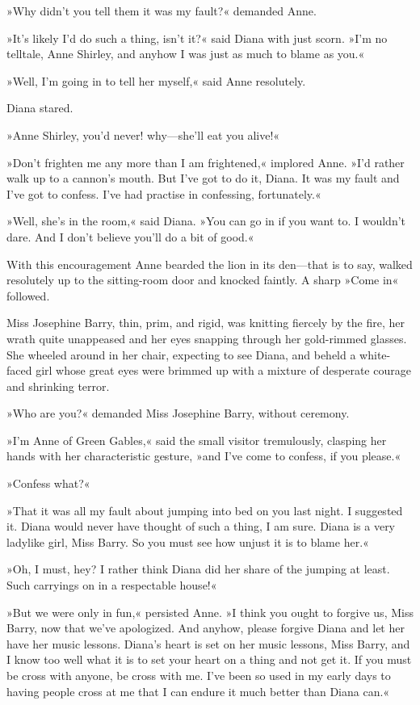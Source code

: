 »Why didn't you tell them it was my fault?« demanded Anne.

»It's likely I'd do such a thing, isn't it?« said Diana with just scorn. »I'm no telltale, Anne Shirley, and anyhow I was just as much to blame as you.«

»Well, I'm going in to tell her myself,« said Anne resolutely.

Diana stared.

»Anne Shirley, you'd never! why—she'll eat you alive!«

»Don't frighten me any more than I am frightened,« implored Anne. »I'd rather walk up to a cannon's mouth. But I've got to do it, Diana. It was my fault and I've got to confess. I've had practise in confessing, fortunately.«

»Well, she's in the room,« said Diana. »You can go in if you want to. I wouldn't dare. And I don't believe you'll do a bit of good.«

With this encouragement Anne bearded the lion in its den—that is to say, walked resolutely up to the sitting-room door and knocked faintly. A sharp »Come in« followed.

Miss Josephine Barry, thin, prim, and rigid, was knitting fiercely by the fire, her wrath quite unappeased and her eyes snapping through her gold-rimmed glasses. She wheeled around in her chair, expecting to see Diana, and beheld a white-faced girl whose great eyes were brimmed up with a mixture of desperate courage and shrinking terror.

»Who are you?« demanded Miss Josephine Barry, without ceremony.

»I'm Anne of Green Gables,« said the small visitor tremulously, clasping her hands with her characteristic gesture, »and I've come to confess, if you please.«

»Confess what?«

»That it was all my fault about jumping into bed on you last night. I suggested it. Diana would never have thought of such a thing, I am sure. Diana is a very ladylike girl, Miss Barry. So you must see how unjust it is to blame her.«

»Oh, I must, hey? I rather think Diana did her share of the jumping at least. Such carryings on in a respectable house!«

»But we were only in fun,« persisted Anne. »I think you ought to forgive us, Miss Barry, now that we've apologized. And anyhow, please forgive Diana and let her have her music lessons. Diana's heart is set on her music lessons, Miss Barry, and I know too well what it is to set your heart on a thing and not get it. If you must be cross with anyone, be cross with me. I've been so used in my early days to having people cross at me that I can endure it much better than Diana can.«

